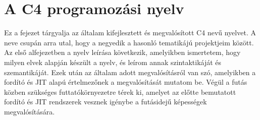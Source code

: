 \chapter{A C4 programozási nyelv}\label{chr:c4}

Ez a fejezet tárgyalja az általam kifejlesztett és megvalósított C4 nevű nyelvet.
A neve csupán arra utal, hogy a negyedik a hasonló tematikájú projektjeim között.
Az első alfejezetben a nyelv leírása következik, amelyikben ismertetem, hogy milyen elvek alapján készült a nyelv, és leírom annak szintaktikáját és szemantikáját.
Ezek után az általam adott megvalósításról van szó, amelyikben a fordító és \gls{JIT} alapú értelmezőnek a megvalósítását mutatom be.
Végül a futás közben szükséges futtatókörnyezetre térek ki, amelyet az előtte bemutatott fordító és \gls{JIT} rendszerek vesznek igénybe a futásidejű képességek megvalósítására.



